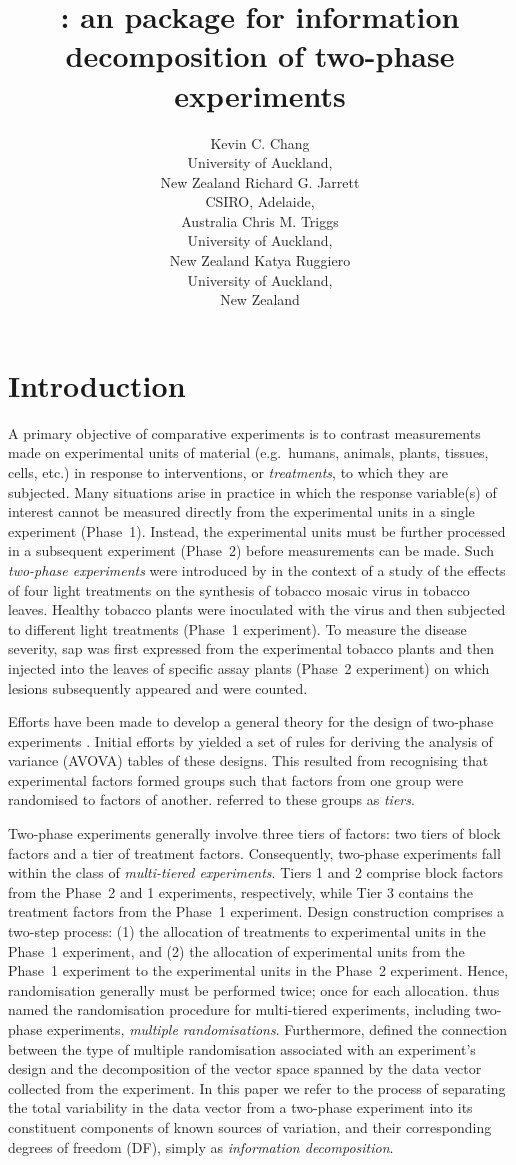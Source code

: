 \documentclass[article]{jss}
\author{Kevin C. Chang\\University of Auckland,\\ New Zealand \And
        Richard G. Jarrett\\CSIRO, Adelaide,\\ Australia \And
        Chris M. Triggs\\University of Auckland,\\ New Zealand \And
        Katya Ruggiero\\University of Auckland,\\ New Zealand }
\title{\pkg{InfoDecompuTE}: an \proglang{R} package for information decomposition of two-phase experiments }
\begin{document}
\section[Introduction]{Introduction}
A primary objective of comparative experiments is to contrast measurements made on experimental units of material (e.g.\ humans, animals, plants, tissues, cells, etc.) in response to interventions, or \emph{treatments}, to which they are subjected. Many situations arise in practice in which the response variable(s) of interest cannot be measured directly from the experimental units in a single experiment (Phase~1). Instead, the experimental units must be further processed in a subsequent experiment (Phase~2) before measurements can be made. Such \emph{two-phase experiments} were introduced by \cite{McIntyre1955} in the context of a study of the effects of four light treatments on the synthesis of tobacco mosaic virus in tobacco leaves. Healthy tobacco plants were inoculated with the virus and then subjected to different light treatments (Phase~1 experiment). To measure the disease severity, sap was first expressed from the experimental tobacco plants and then injected into the leaves of specific assay plants (Phase~2 experiment) on which lesions subsequently appeared and were counted. 

Efforts have been made to develop a general theory for the design of two-phase experiments \citep{Brien1983, Wood1988, Brien1999, Jarrett2008}. Initial efforts by \cite{Brien1983} yielded a set of rules for deriving the analysis of variance (AVOVA) tables of these designs. This resulted from recognising that experimental factors formed groups such that factors from one group were randomised to factors of another. \cite{Brien1983} referred to these groups as \emph{tiers}. 
 
Two-phase experiments generally involve three tiers of factors: two tiers of block factors and a tier of treatment factors. Consequently, two-phase experiments fall within the class of \emph{multi-tiered experiments}. Tiers 1 and 2 comprise block factors from the Phase~2 and 1 experiments, respectively, while Tier 3 contains the treatment factors from the Phase~1 experiment. Design construction comprises a two-step process: (1) the allocation of treatments to experimental units in the Phase~1 experiment, and (2) the allocation of experimental units from the Phase~1 experiment to the experimental units in the Phase~2 experiment. Hence, randomisation generally must be performed twice; once for each allocation. \cite{Brien2006b} thus named the randomisation procedure for multi-tiered experiments, including two-phase experiments, \emph{multiple randomisations}. Furthermore, \cite{Brien2009, Brien2010} defined the connection between the type of multiple randomisation associated with an experiment's design and the decomposition of the vector space spanned by the data vector collected from the experiment. In this paper we refer to the process of separating the total variability in the data vector from a two-phase experiment into its constituent components of known sources of variation, and their corresponding degrees of freedom (DF), simply as \emph{information decomposition}.
\end{document}
